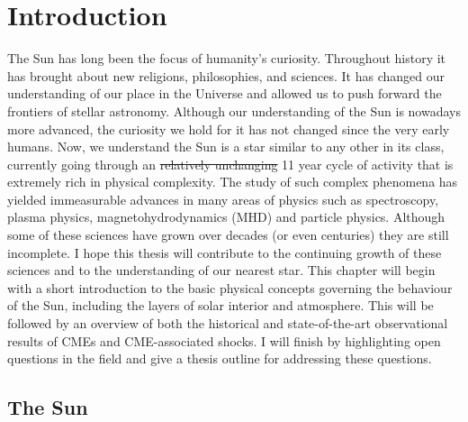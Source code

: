 \singlespacing
\chapter{Introduction}
\label{chap:1}
\vspace{-8mm}
\doublespacing
The Sun has long been the focus of humanity's curiosity. Throughout history it has brought about new religions, philosophies, and sciences. It has changed our understanding of our place in the Universe and allowed us to push forward the frontiers of stellar astronomy. Although our understanding of the Sun is nowadays more advanced, the curiosity we hold for it has not changed since the very early humans.
Now, we understand the Sun is a star similar to any other in its class, currently going through an \st{relatively unchanging} 11 year cycle of activity that is extremely rich in physical complexity. The study of such complex phenomena has yielded immeasurable advances in many areas of physics such as spectroscopy, plasma physics, magnetohydrodynamics (MHD) and particle physics. Although some of these sciences have grown over decades (or even centuries) they are still incomplete. I hope this thesis will contribute to the continuing growth of these sciences and to the understanding of our nearest star.
\clearpage	
\noindent
This chapter will begin with a short introduction to the basic physical concepts governing the behaviour of the Sun, including the layers of solar interior and atmosphere. This will be followed by an overview of both the historical and state-of-the-art observational results of CMEs and CME-associated shocks. I will finish by highlighting open questions in the field and give a thesis outline for addressing these questions.

\section{The Sun}\label{sec:1}

